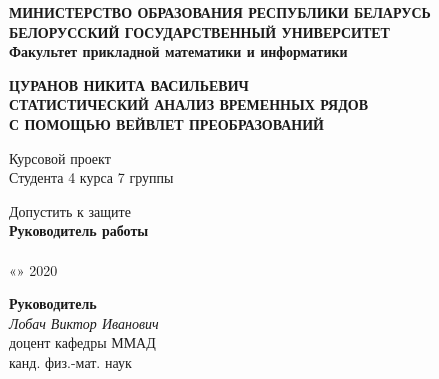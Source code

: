 \documentclass[a4paper]{article}
\begin{document}
	\begin{center}
		\textbf{
			МИНИСТЕРСТВО ОБРАЗОВАНИЯ РЕСПУБЛИКИ БЕЛАРУСЬ \\
			БЕЛОРУССКИЙ ГОСУДАРСТВЕННЫЙ УНИВЕРСИТЕТ \\
			Факультет прикладной математики и информатики
		} \\
		
		\vspace{1em}
		
	\end{center}
	
	\vspace{10em}
	
	\begin{center}
		\textbf{
			ЦУРАНОВ НИКИТА ВАСИЛЬЕВИЧ \\
			\vspace{1em}
			СТАТИСТИЧЕСКИЙ АНАЛИЗ ВРЕМЕННЫХ РЯДОВ \\
			С ПОМОЩЬЮ ВЕЙВЛЕТ ПРЕОБРАЗОВАНИЙ
		}
		
		\vspace{3em}
		Курсовой проект \\
		Студента 4 курса 7 группы
		
	\end{center}
	
	\vspace{10em}
	
	\begin{minipage}{0.4\textwidth}
		\begin{center}
			Допустить к защите \\
			\textbf{Руководитель работы} \\
			\underline{
				\qquad\qquad\qquad
				\qquad\qquad\quad
			} \\
			«\qquad»\underline{\qquad\qquad\qquad} 2020
		\end{center}
	\end{minipage}
	\hfill
	\begin{minipage}{0.4\textwidth}
		\begin{center}
			\textbf{Руководитель} \\
			\textit{Лобач Виктор Иванович} \\ 
			доцент кафедры ММАД \\ 
			канд. физ.-мат. наук
		\end{center}
	\end{minipage}
	
\end{document}
